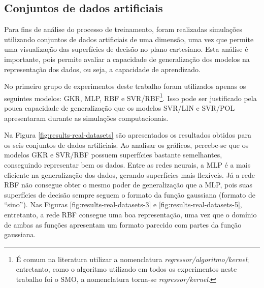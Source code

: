 \subsection{Conjuntos de dados artificiais}
Para fins de análise do processo de treinamento, foram realizadas simulações utilizando conjuntos de dados artificiais de uma dimensão, uma vez que permite uma visualização das superfícies de decisão no plano cartesiano. Esta análise é importante, pois permite avaliar a capacidade de generalização dos modelos na representação dos dados, ou seja, a capacidade de aprendizado.

No primeiro grupo de experimentos deste trabalho foram utilizados apenas os seguintes modelos: GKR, MLP, RBF e SVR/RBF\footnote{É comum na literatura utilizar a nomenclatura \textit{regressor/algoritmo/kernel}; entretanto, como o algoritmo utilizado em todos os experimentos neste trabalho foi o SMO, a nomenclatura torna-se \textit{regressor/kernel}.}. Isso pode ser justificado pela pouca capacidade de generalização que os modelos SVR/LIN e SVR/POL apresentaram durante as simulações computacionais.

Na Figura \ref{fig:results-real-datasets} são apresentados os resultados obtidos para os seis conjuntos de dados artificiais. %
Ao analisar os gráficos, percebe-se que os modelos GKR e SVR/RBF possuem superfícies bastante semelhantes, conseguindo representar bem os dados. Entre as redes neurais, a MLP é a mais eficiente na generalização dos dados, gerando superfícies mais flexíveis. Já a rede RBF não consegue obter o mesmo poder de generalização que a MLP, pois suas superfícies de decisão sempre seguem o formato da função gaussiana (formato de ``sino''). Nas Figuras \ref{fig:results-real-datasets-3} e \ref{fig:results-real-datasets-5}, entretanto, a rede RBF consegue uma boa representação, uma vez que o domínio de ambas as funções apresentam um formato parecido com partes da função gaussiana.

